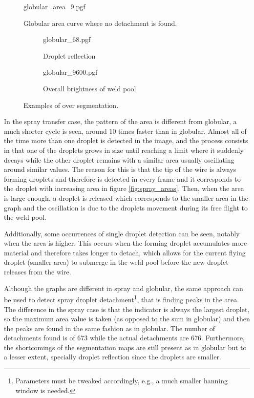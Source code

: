  \begin{figure}
    {globular_area_9.pgf}
    \caption[Globular area curve where no detachment is found]{Globular area curve where no detachment is found.}
    \label{fig:no_detachment}
\end{figure}
\begin{figure}
  \begin{subfigure}[b]{\textwidth}
    {globular_68.pgf}
    \caption{Droplet reflection}

  \end{subfigure}
\vfill
  \begin{subfigure}[b]{\textwidth}
    {globular_9600.pgf}
    \caption{Overall brightness of weld pool}
  \end{subfigure}
\caption[Examples of over segmentation]{Examples of over segmentation.} 
\label{fig:reflection}
\end{figure}

 In the spray transfer case, the pattern of the area is different from globular, a much shorter cycle is seen, around 10 times faster than in globular. Almost all of the time more than one droplet is detected in the image, and the process consists in that one of the droplets grows in size until reaching a limit where it suddenly decays while the other droplet remains with a similar area usually oscillating around similar values. The reason for this is that the tip of the wire is always forming droplets and therefore is detected in every frame and it corresponds to the droplet with increasing area in figure \ref{fig:spray_areas}. Then, when the area is large enough, a droplet is released which corresponds to the smaller area in the graph and the oscillation is due to the droplets movement during its free flight to the weld pool.
 
 Additionally, some occurrences of single droplet detection can be seen, notably when the area is higher. This occurs when the forming droplet accumulates more material and therefore takes longer to detach, which allows for the current flying droplet (smaller area) to submerge in the weld pool before the new droplet releases from the wire.

Although the graphs are different in spray and globular, the same approach can be used to detect spray droplet detachment\footnote{Parameters must be tweaked accordingly, e.g., a much smaller hanning window is needed.}, that is finding peaks in the area. The difference in the spray case is that the indicator is always the largest droplet, so the maximum area value is taken (as opposed to the sum in globular) and then the peaks are found in the same fashion as in globular. The number of detachments found is of 673 while the actual detachments are 676. Furthermore, the shortcomings of the segmentation maps are still present as in globular but to a lesser extent, specially droplet reflection since the droplets are smaller.

